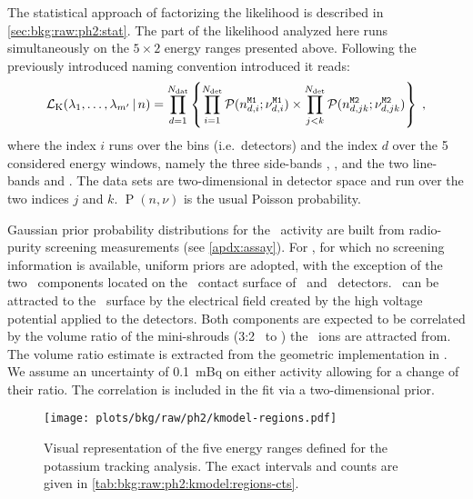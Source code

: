 The statistical approach of factorizing the likelihood is described in
\cref{sec:bkg:raw:ph2:stat}. The part of the likelihood analyzed here runs simultaneously
on the $5 \times 2$ energy ranges presented above. Following the previously introduced
naming convention introduced it reads:
\begin{equation}\label{eq:bkg:raw:ph2:kmodel:likelihood}
  \mathcal{L}_\text{K}(\lambda_1,\ldots,\lambda_{m'}\,|\,n) =
  \prod_{d=1}^{N_\text{dat}}
  \left\{
    \prod_{i=1}^{N_\text{det}}
    \mathcal{P}(n_{d,i}^\text{\texttt{M1}};\nu_{d,i}^\text{\texttt{M1}})
    \times
    \prod_{j<k}^{N_\text{det}}
    \mathcal{P}(n_{d,jk}^\text{\texttt{M2}};\nu_{d,jk}^\text{\texttt{M2}})
  \right\}\;,
\end{equation}
where the index $i$ runs over the bins (i.e.~detectors) and the index $d$ over the 5
considered energy windows, namely the three side-bands , ,  and the
two line-bands  and .  The  data sets are two-dimensional in detector
space and run over the two indices $j$ and $k$. $\operatorname{P}(n,\nu)$ is the usual
Poisson probability.

Gaussian prior probability distributions for the \kvn\ activity are built from
radio-purity screening measurements (see \cref{apdx:assay}). For \kvz, for which no
screening information is available, uniform priors are adopted, with the exception of the
two \kvz\ components located on the \nplus\ contact surface of \bege\ and \scoax\
detectors. \kvz\ can be attracted to the \nplus\ surface by the electrical field created
by the high voltage potential applied to the detectors. Both components are expected to be
correlated by the volume ratio of the mini-shrouds (3:2 \bege\ to \scoax) the \kvz\ ions
are attracted from. The volume ratio estimate is extracted from the geometric
implementation in \mage.  We assume an uncertainty of 0.1~mBq on either activity allowing
for a change of their ratio. The correlation is included in the fit via a two-dimensional
prior.

\begin{figure}
  \centering
  \texttt{[image: plots/bkg/raw/ph2/kmodel-regions.pdf]}
  \caption{%
    Visual representation of the five energy ranges defined for the potassium tracking
    analysis. The exact intervals and counts are given in
    \cref{tab:bkg:raw:ph2:kmodel:regions-cts}.
  }\label{fig:bkg:raw:ph2:kmodel:regions}
\end{figure}

